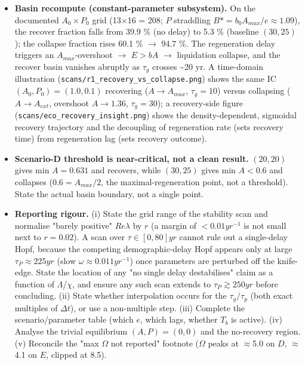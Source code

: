 \documentclass[11pt]{article}
\begin{document}
\begin{itemize}
\item \textbf{Basin recompute (constant-parameter subsystem).} On the documented $A_{0}\times{}P_{0}$ grid (13\ensuremath{\times{}}16 = 208; $P$ straddling $B* = b_{0}A_{max}/e \approx{} 1.09$), the recover fraction falls from 39.9 \% (no delay) to 5.3 \% (baseline $(30,25)$); the collapse fraction rises 60.1 \% \ensuremath{\to{}} 94.7 \%. The regeneration delay triggers an $A_{max}$-overshoot \ensuremath{\to{}} $E>bA$ \ensuremath{\to{}} liquidation collapse, and the recover basin vanishes abruptly as $\tau{}_{g}$ crosses \~{}20 yr. A time-domain illustration (\texttt{scans/r1\_recovery\_vs\_collapse.png}) shows the same IC $(A_{0},P_{0})=(1.0,0.1)$ recovering ($A\to{}A_{max}$, $\tau{}_{g}=10$) versus collapsing ($A\to{}A_{ext}$, overshoot $A\to{}1.36$, $\tau{}_{g}=30$); a recovery-side figure (\texttt{scans/eco\_recovery\_insight.png}) shows the density-dependent, sigmoidal recovery trajectory and the decoupling of regeneration rate (sets recovery time) from regeneration lag (sets recovery outcome).
\item \textbf{Scenario-D threshold is near-critical, not a clean result.} $(20,20)$ gives min $A = 0.631$ and recovers, while $(30,25)$ gives min $A < 0.6$ and collapses ($0.6 = A_{max}/2$, the maximal-regeneration point, not a threshold). State the actual basin boundary, not a single point.
\item \textbf{Reporting rigour.} (i) State the grid range of the stability scan and normalise "barely positive" $Re \lambda{}$ by $r$ (a margin of $< 0.01 yr^{-1}$ is not small next to $r = 0.02$). A scan over $\tau{} \in{} [0,80] yr$ cannot rule out a single-delay Hopf, because the competing demographic-delay Hopf appears only at large $\tau{}_{P} \approx{} 225 yr$ (slow $\omega{} \approx{} 0.011 yr^{-1}$) once parameters are perturbed off the knife-edge. State the location of any "no single delay destabilises" claim as a function of $\Lambda{}$/$\chi{}$, and ensure any such scan extends to $\tau{}_{P} \gtrsim{} 250 yr$ before concluding. (ii) State whether interpolation occurs for the $\tau{}_{g}/\tau{}_{p}$ (both exact multiples of $\Delta{}t$), or use a non-multiple step. (iii) Complete the scenario/parameter table (which $e$, which lags, whether $T_{b}$ is active). (iv) Analyse the trivial equilibrium $(A,P)=(0,0)$ and the no-recovery region. (v) Reconcile the "max \ensuremath{\Omega{}} not reported" footnote (\ensuremath{\Omega{}} peaks at \ensuremath{\approx{}}5.0 on $D$, \ensuremath{\approx{}}4.1 on $E$, clipped at 8.5).

\end{itemize}
\end{document}
